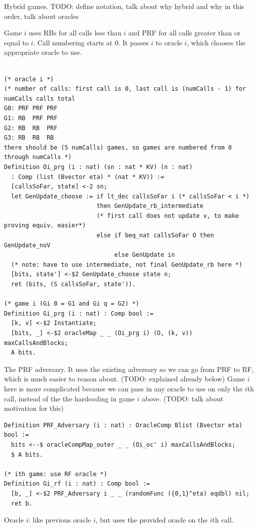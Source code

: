 \documentclass[12pt,lot, lof]{puthesis}
\begin{document}
{Hybrid games. 
TODO: define notation, talk about why hybrid and why in this order, talk about oracles

Game $i$ uses RBs for all calls less than $i$ and PRF for all calls greater than or equal to $i$. Call numbering starts at $0$. It passes $i$ to oracle $i$, which chooses the appropriate oracle to use.

\begin{lstlisting}

(* oracle i *)
(* number of calls: first call is 0, last call is (numCalls - 1) for numCalls calls total
G0: PRF PRF PRF
G1: RB  PRF PRF
G2: RB  RB  PRF
G3: RB  RB  RB 
there should be (S numCalls) games, so games are numbered from 0 through numCalls *)
Definition Oi_prg (i : nat) (sn : nat * KV) (n : nat)
  : Comp (list (Bvector eta) * (nat * KV)) :=
  [callsSoFar, state] <-2 sn;
  let GenUpdate_choose := if lt_dec callsSoFar i (* callsSoFar < i *)
                          then GenUpdate_rb_intermediate
                          (* first call does not update v, to make proving equiv. easier*)
                          else if beq_nat callsSoFar O then GenUpdate_noV
                               else GenUpdate in
  (* note: have to use intermediate, not final GenUpdate_rb here *)
  [bits, state'] <-$2 GenUpdate_choose state n;
  ret (bits, (S callsSoFar, state')).

(* game i (Gi 0 = G1 and Gi q = G2) *)
Definition Gi_prg (i : nat) : Comp bool :=
  [k, v] <-$2 Instantiate;
  [bits, _] <-$2 oracleMap _ _ (Oi_prg i) (O, (k, v)) maxCallsAndBlocks;
  A bits.
\end{lstlisting}  

The PRF adversary. It uses the existing adversary so we can go from PRF to RF, which is much easier to reason about. (TODO: explained already below) Game $i$ here is more complicated because we can pass in any oracle to use on only the $i$th call, instead of the the hardcoding in game $i$ above. (TODO: talk about motivation for this)

\begin{lstlisting}
Definition PRF_Adversary (i : nat) : OracleComp Blist (Bvector eta) bool :=
  bits <--$ oracleCompMap_outer _ _ (Oi_oc' i) maxCallsAndBlocks;
  $ A bits.

(* ith game: use RF oracle *)
Definition Gi_rf (i : nat) : Comp bool :=
  [b, _] <-$2 PRF_Adversary i _ _ (randomFunc ({0,1}^eta) eqdbl) nil;
  ret b.
\end{lstlisting}

Oracle $i$: like previous oracle $i$, but uses the provided oracle on the $i$th call.

}
\end{document}
